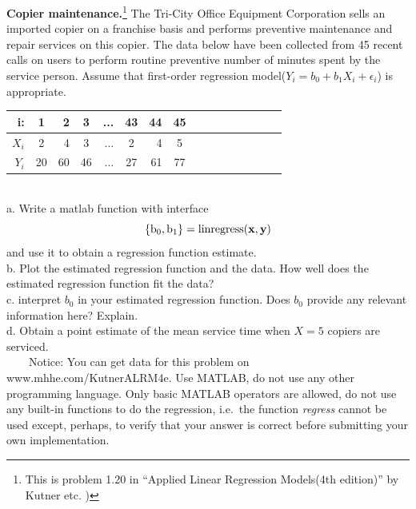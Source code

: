 \documentclass[12pt]{article}
\begin{document}
 { \textbf{Copier maintenance.}\footnote[1]{This is
problem 1.20 in ``Applied Linear Regression Models(4th edition)'' by
Kutner etc. )} The Tri-City Office Equipment Corporation sells an
imported copier on a franchise basis and performs preventive
maintenance and repair services on this copier. The data below have
been collected from 45 recent calls on users to perform routine
preventive number of minutes spent by the service person. Assume
that first-order regression model($Y_i=b_0+b_1 X_i+\epsilon_i$) is
appropriate.
\begin{table}[htdp]
\begin{center}
\begin{tabular}{rcrcrcrcrcrcrcrc}
\textbf{i:} &\textbf{1} &\textbf{2}& \textbf{3}&...&\textbf{43}&\textbf{44}&\textbf{45}\\
\hline \textbf{$X_i$} &2 &4 &3 &... &2 &4 &5\\
\textbf{$Y_i$} &20 &60 &46 &... &27 &61 &77
\end{tabular}
\end{center}
\end{table}\\

a. Write a matlab function with interface
\[ \mathrm{\{b_0,b_1\} = linregress(\bf x,\bf y)}\]
and use it to obtain a regression function estimate.\\
b. Plot the estimated regression function and the data. How well
does the estimated regression function fit the data?\\
c. interpret $b_0$ in your estimated regression function. Does $b_0$
provide any relevant information here? Explain.\\
d. Obtain a point estimate of the mean service time when $X=5$
copiers are serviced.\\
\indent~~~~Notice: You can get data for this problem on
www.mhhe.com/KutnerALRM4e. Use MATLAB, do not
use any other programming language. Only basic MATLAB operators are
allowed, do not use any built-in functions to do the regression, i.e.~the function {\em regress} cannot be used except, perhaps, to verify that your answer is correct before submitting your own implementation. \\}
\end{document}
